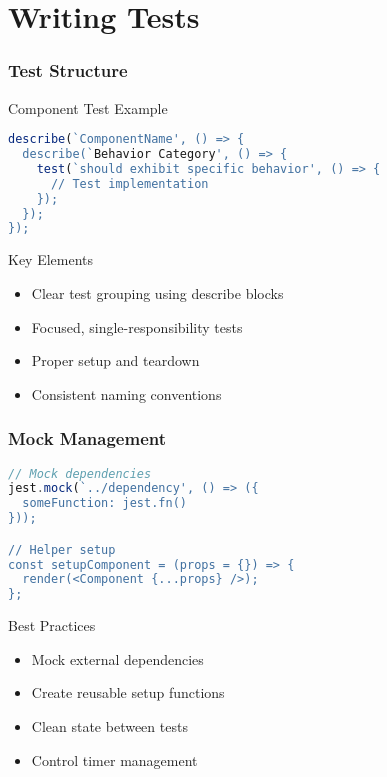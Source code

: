 \documentclass{beamer}
\begin{document}
\section{Writing Tests}
\begin{frame}[fragile]
    \frametitle{Test Structure}
    \begin{block}{Component Test Example}
        \begin{lstlisting}[language=JavaScript]
describe(`ComponentName', () => {
  describe(`Behavior Category', () => {
    test(`should exhibit specific behavior', () => {
      // Test implementation
    });
  });
});
        \end{lstlisting}
    \end{block}
    
    \begin{alertblock}{Key Elements}
        \begin{itemize}
            \item Clear test grouping using describe blocks
            \item Focused, single-responsibility tests
            \item Proper setup and teardown
            \item Consistent naming conventions
        \end{itemize}
    \end{alertblock}
\end{frame}

\begin{frame}[fragile]
    \frametitle{Mock Management}
    \begin{lstlisting}[language=JavaScript]
// Mock dependencies
jest.mock(`../dependency', () => ({
  someFunction: jest.fn()
}));

// Helper setup
const setupComponent = (props = {}) => {
  render(<Component {...props} />);
};
    \end{lstlisting}
    
    \begin{block}{Best Practices}
        \begin{itemize}
            \item Mock external dependencies
            \item Create reusable setup functions
            \item Clean state between tests
            \item Control timer management
        \end{itemize}
    \end{block}
\end{frame}
\end{document}
